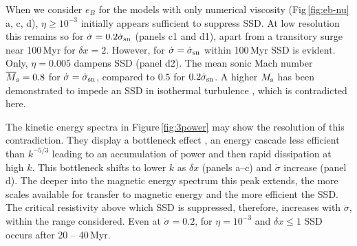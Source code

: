 \documentclass[preprint2]{aastex63}
\newcommand\SNr{\dot\sigma_{\rm sn}}
\newcommand\Ms{M_{\rm s}}
\newcommand\dx{ {\delta x}}
\newcommand{\fg}[1]{\textcolor{midgreen}{#1}}
\begin{document}
 \fg{When we consider $e_B$ for the models {with} only numerical
 viscosity
 (Fig\,\ref{fig:eb-nu} a, c, d), $\eta\geq10^{-3}$ initially appears
 sufficient to suppress SSD.
 At low resolution this remains so for $\dot\sigma=0.2\SNr$ (panels c1 and d1),
 apart from a transitory surge near 100\,Myr for $\dx=2$.
 However, for $\dot\sigma=\SNr$ within 100\,Myr SSD is evident.
 Only, $\eta=0.005$ dampens SSD (panel d2).}
 The mean sonic Mach number $\overline\Ms=0.8$ for $\dot\sigma=\SNr$, compared
 to $0.5$ for $0.2\SNr$.
 A higher $\Ms$ has been demonstrated to impede an SSD in isothermal turbulence
 \citep{Haugen:2004M}, which is contradicted here.

 \fg{The kinetic energy spectra in Figure\,\ref{fig:3power}} may
 show the resolution of this contradiction.
 They display a bottleneck effect \citep{Falkovich94,HBD03}, an energy cascade
 less efficient than $k^{-5/3}$
 leading to an accumulation of power and then rapid dissipation at high $k$.
 This bottleneck shifts to lower $k$ as $\dx$
 \fg{(panels a--c) and $\dot\sigma$ increase (panel d).}
 \fg{The deeper into the magnetic energy spectrum this peak extends, the more 
 scales available for transfer to magnetic energy and the more
 efficient the SSD.
 The critical resistivity above which SSD is suppressed, therefore, 
 increases with $\dot\sigma$, within the range considered. 
 Even at $\dot\sigma=0.2$, for $\eta=10^{-3}$ and $\dx\leq1$ SSD occurs after
 20 -- 40\,Myr.}
\end{document}
